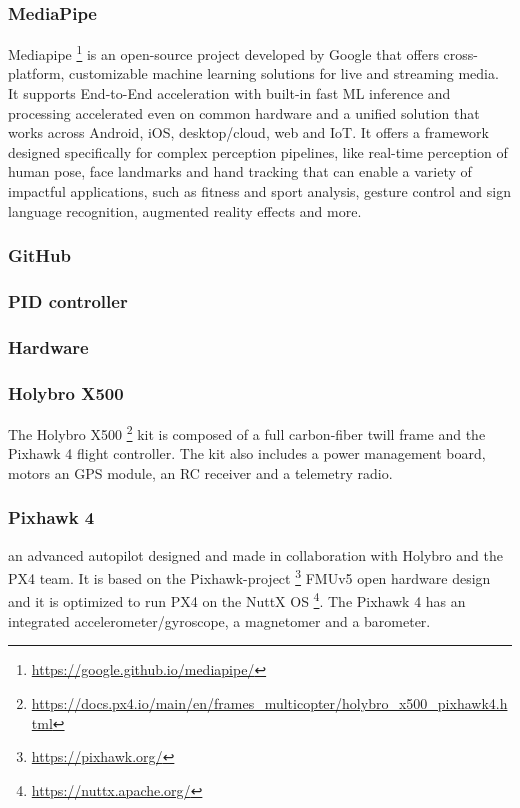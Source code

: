\subsubsection{MediaPipe}
\label{subsec:mediapipe}
Mediapipe \footnote{\url{https://google.github.io/mediapipe/}} is an open-source project developed by Google that offers cross-platform, customizable machine learning solutions for live and streaming media.
It supports End-to-End acceleration with built-in fast ML inference and processing accelerated even on common hardware and a unified solution that works across Android, iOS, desktop/cloud, web and IoT.
It offers a framework designed specifically for complex perception pipelines, like real-time perception of human pose, face landmarks and hand tracking that can enable a variety of impactful applications, such as fitness and sport analysis, gesture control and sign language recognition, augmented reality effects and more. 


\subsubsection{GitHub}
\label{subsec:github}


\subsubsection{PID controller}
\label{subsec:pid-theory}



\subsubsection{Hardware}
\subsubsection{Holybro X500}
\label{subsec:x500}
The Holybro X500 \footnote{\url{https://docs.px4.io/main/en/frames_multicopter/holybro_x500_pixhawk4.html}} kit is composed of a full carbon-fiber twill frame and the Pixhawk 4 flight controller.
The kit also includes a power management board, motors an GPS module, an RC receiver and a telemetry radio.


\subsubsection{Pixhawk 4}
\label{subsec:pixhawk}
an advanced autopilot designed and made in collaboration with Holybro and the PX4 team.
It is based on the Pixhawk-project \footnote{\url{https://pixhawk.org/}} FMUv5 open hardware design and it is optimized to run PX4 on the NuttX OS \footnote{\url{https://nuttx.apache.org/}}.
The Pixhawk 4 has an integrated accelerometer/gyroscope, a magnetomer and a barometer.


